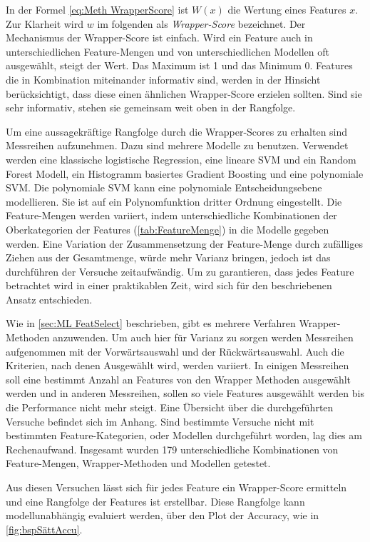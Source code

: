 In der Formel \ref{eq:Meth WrapperScore} ist \(W(x)\) die Wertung eines Features \(x\). Zur Klarheit wird \(w\) im folgenden als \textit{Wrapper-Score} bezeichnet. Der Mechanismus der Wrapper-Score ist einfach. Wird ein Feature auch in unterschiedlichen Feature-Mengen und von unterschiedlichen Modellen oft ausgewählt, steigt der Wert. Das Maximum ist 1 und das Minimum 0. Features die in Kombination miteinander informativ sind, werden in der Hinsicht berücksichtigt, dass diese einen ähnlichen Wrapper-Score erzielen sollten. Sind sie sehr informativ, stehen sie gemeinsam weit oben in der Rangfolge. \par

Um eine aussagekräftige Rangfolge durch die Wrapper-Scores zu erhalten sind Messreihen aufzunehmen. Dazu sind mehrere Modelle zu benutzen. Verwendet werden eine klassische logistische Regression, eine lineare SVM und ein Random Forest Modell, ein Histogramm basiertes Gradient Boosting und eine polynomiale SVM. Die polynomiale SVM kann eine polynomiale Entscheidungsebene modellieren. Sie ist auf ein Polynomfunktion dritter Ordnung eingestellt. Die Feature-Mengen werden variiert, indem unterschiedliche Kombinationen der Oberkategorien der Features (\autoref{tab:FeatureMenge}) in die Modelle gegeben werden. Eine Variation der Zusammensetzung der Feature-Menge durch zufälliges Ziehen aus der Gesamtmenge, würde mehr Varianz bringen, jedoch ist das durchführen der Versuche zeitaufwändig. Um zu garantieren, dass jedes Feature betrachtet wird in einer praktikablen Zeit, wird sich für den beschriebenen Ansatz entschieden.\par

Wie in \autoref{sec:ML FeatSelect} beschrieben, gibt es mehrere Verfahren Wrapper-Methoden anzuwenden. Um auch hier für Varianz zu sorgen werden Messreihen aufgenommen mit der Vorwärtsauswahl und der Rückwärtsauswahl. Auch die Kriterien, nach denen Ausgewählt wird, werden variiert. In einigen Messreihen soll eine bestimmt Anzahl an Features von den Wrapper Methoden ausgewählt werden und in anderen Messreihen, sollen so viele Features ausgewählt werden bis die Performance nicht mehr steigt. Eine Übersicht über die durchgeführten Versuche befindet sich im Anhang. Sind bestimmte Versuche nicht mit bestimmten Feature-Kategorien, oder Modellen durchgeführt worden, lag dies am Rechenaufwand. Insgesamt wurden 179 unterschiedliche Kombinationen von Feature-Mengen, Wrapper-Methoden und Modellen getestet. \par

Aus diesen Versuchen lässt sich für jedes Feature ein Wrapper-Score ermitteln und eine Rangfolge der Features ist erstellbar. Diese Rangfolge kann modellunabhängig evaluiert werden, über den Plot der Accuracy, wie in \autoref{fig:bspSättAccu}. \par

